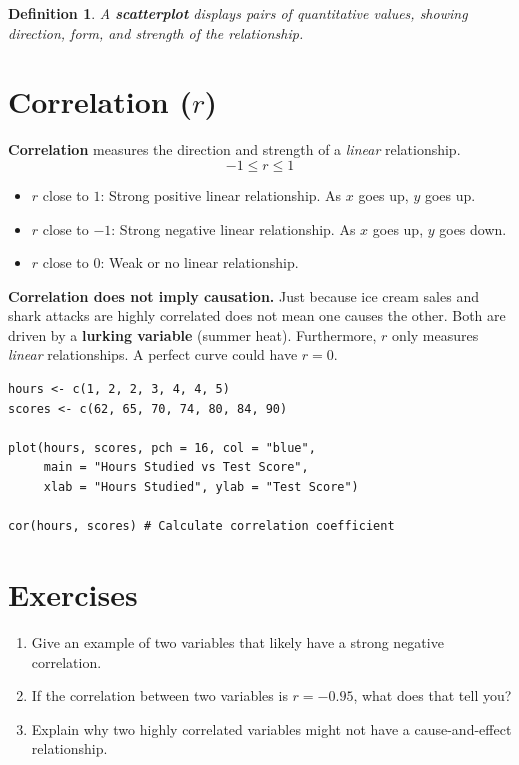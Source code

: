 \documentclass[11pt,openany]{book}
\newtheorem*{definition*}{Definition}
\begin{document}
\begin{definition*}
A \textbf{scatterplot} displays pairs of quantitative values, showing direction, form, and strength of the relationship.
\end{definition*}

\section{Correlation ($r$)}
\textbf{Correlation} measures the direction and strength of a \textit{linear} relationship.
\[
-1 \leq r \leq 1
\]
\begin{itemize}
    \item $r$ close to $1$: Strong positive linear relationship. As $x$ goes up, $y$ goes up.
    \item $r$ close to $-1$: Strong negative linear relationship. As $x$ goes up, $y$ goes down.
    \item $r$ close to $0$: Weak or no linear relationship.
\end{itemize}

\begin{mistakealert}
\textbf{Correlation does not imply causation.} Just because ice cream sales and shark attacks are highly correlated does not mean one causes the other. Both are driven by a \textbf{lurking variable} (summer heat). Furthermore, $r$ only measures \textit{linear} relationships. A perfect curve could have $r = 0$.
\end{mistakealert}

\begin{rstudio}
\begin{lstlisting}[style=rcode]
hours <- c(1, 2, 2, 3, 4, 4, 5)
scores <- c(62, 65, 70, 74, 80, 84, 90)

plot(hours, scores, pch = 16, col = "blue",
     main = "Hours Studied vs Test Score",
     xlab = "Hours Studied", ylab = "Test Score")

cor(hours, scores) # Calculate correlation coefficient
\end{lstlisting}
\end{rstudio}

\section{Exercises}
\begin{enumerate}
    \item Give an example of two variables that likely have a strong negative correlation.
    \item If the correlation between two variables is $r = -0.95$, what does that tell you?
    \item Explain why two highly correlated variables might not have a cause-and-effect relationship.
\end{enumerate}
\end{document}
